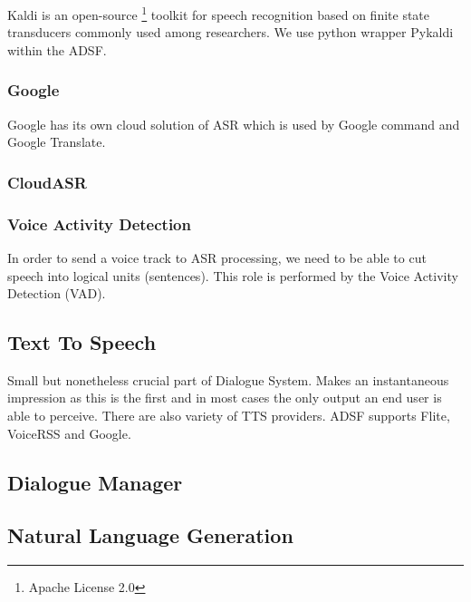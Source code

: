 Kaldi is an open-source \footnote{Apache License 2.0} toolkit for speech recognition based on finite state transducers commonly used among researchers.
We use python wrapper Pykaldi within the ADSF.


\subsubsection{Google}

Google has its own cloud solution of ASR which is used by Google command and Google Translate.


\subsubsection{CloudASR}


\subsubsection{Voice Activity Detection}

In order to send a voice track to ASR processing, we need to be able to cut speech into logical units (sentences).
This role is performed by the Voice Activity Detection (VAD).

\subsection{Text To Speech}

Small but nonetheless crucial part of Dialogue System.
Makes an instantaneous impression as this is the first and in most cases the only output an end user is able to perceive. %
There are also variety of TTS providers. ADSF supports Flite, VoiceRSS and Google.

\subsection{Dialogue Manager}


\subsection{Natural Language Generation}


